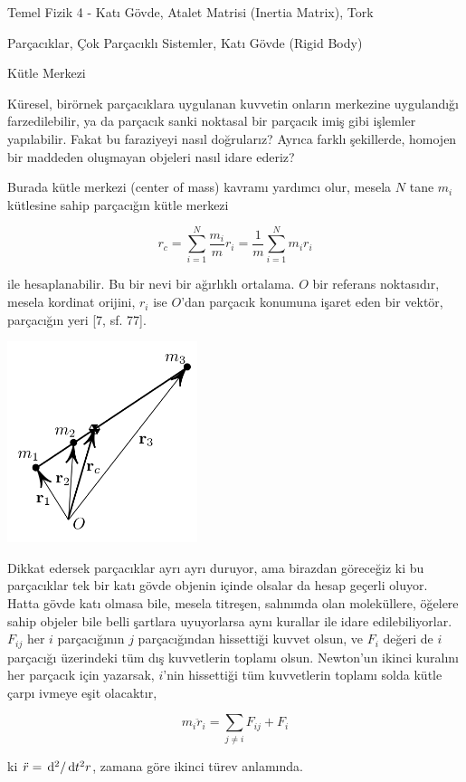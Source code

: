 \documentclass[12pt,fleqn]{article}\usepackage{../../common}
\begin{document}
Temel Fizik 4 - Katı Gövde, Atalet Matrisi (Inertia Matrix), Tork

Parçacıklar, Çok Parçacıklı Sistemler, Katı Gövde (Rigid Body)

Kütle Merkezi

Küresel, birörnek parçacıklara uygulanan kuvvetin onların merkezine uygulandığı
farzedilebilir, ya da parçacık sanki noktasal bir parçacık imiş gibi işlemler
yapılabilir. Fakat bu faraziyeyi nasıl doğrularız? Ayrıca farklı şekillerde,
homojen bir maddeden oluşmayan objeleri nasıl idare ederiz?

Burada kütle merkezi (center of mass) kavramı yardımcı olur, mesela $N$ tane
$m_i$ kütlesine sahip parçacığın kütle merkezi

$$
r_c =
\sum _{i=1}^{N} \frac{m_i}{m} r_i =
\frac{1}{m} \sum _{i=1}^{N} m_i r_i
$$

ile hesaplanabilir. Bu bir nevi bir ağırlıklı ortalama. $O$ bir referans
noktasıdır, mesela kordinat orijini, $r_i$ ise $O$'dan parçacık konumuna işaret
eden bir vektör, parçacığın yeri [7, sf. 77].

\includegraphics[width=15em]{phy_005_basics_08.png}

Dikkat edersek parçacıklar ayrı ayrı duruyor, ama birazdan göreceğiz ki bu
parçacıklar tek bir katı gövde objenin içinde olsalar da hesap geçerli
oluyor. Hatta gövde katı olmasa bile, mesela titreşen, salınımda olan
moleküllere, öğelere sahip objeler bile belli şartlara uyuyorlarsa aynı kurallar
ile idare edilebiliyorlar. $F_{ij}$ her $i$ parçacığının $j$ parçacığından
hissettiği kuvvet olsun, ve $F_i$ değeri de $i$ parçacığı üzerindeki tüm dış
kuvvetlerin toplamı olsun. Newton'un ikinci kuralını her parçacık için yazarsak,
$i$'nin hissettiği tüm kuvvetlerin toplamı solda kütle çarpı ivmeye eşit
olacaktır,

$$
m_i \ddot{r}_i = \sum _{j \ne i} F_{ij} + F_i
$$

ki $\ddot{r} = \,\mathrm{d}^2 / \,\mathrm{d} t^2 r$, zamana göre ikinci türev anlamında.
\end{document}
